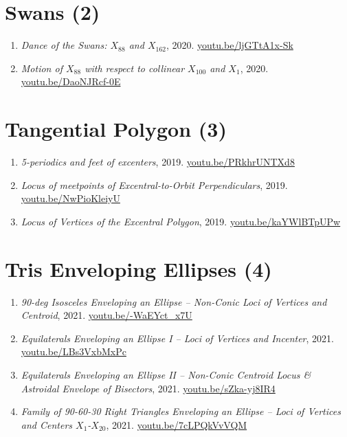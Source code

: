 \documentclass[12pt]{article}
\begin{document}
\section{Swans (2)}

\begin{enumerate}[resume]
\item \textit{Dance of the Swans: $X_{88}$ and $X_{162}$}, 2020. \href{https://youtu.be/ljGTtA1x-Sk}{\url{youtu.be/ljGTtA1x-Sk}}
\item \textit{Motion of $X_{88}$ with respect to collinear $X_{100}$ and $X_{1}$}, 2020. \href{https://youtu.be/DaoNJRcf-0E}{\url{youtu.be/DaoNJRcf-0E}}
\end{enumerate}

\section{Tangential Polygon (3)}

\begin{enumerate}[resume]
\item \textit{5-periodics and feet of excenters}, 2019. \href{https://youtu.be/PRkhrUNTXd8}{\url{youtu.be/PRkhrUNTXd8}}
\item \textit{Locus of meetpoints of Excentral-to-Orbit Perpendiculars}, 2019. \href{https://youtu.be/NwPioKleiyU}{\url{youtu.be/NwPioKleiyU}}
\item \textit{Locus of Vertices of the Excentral Polygon}, 2019. \href{https://youtu.be/kaYWlBTpUPw}{\url{youtu.be/kaYWlBTpUPw}}
\end{enumerate}

\section{Tris Enveloping Ellipses (4)}

\begin{enumerate}[resume]
\item \textit{90-deg Isosceles Enveloping an Ellipse -- Non-Conic Loci of Vertices and Centroid}, 2021. \href{https://youtu.be/-WaEYct_x7U}{\url{youtu.be/-WaEYct\_x7U}}
\item \textit{Equilaterals Enveloping an Ellipse I -- Loci of Vertices and Incenter}, 2021. \href{https://youtu.be/LBs3VxbMxPc}{\url{youtu.be/LBs3VxbMxPc}}
\item \textit{Equilaterals Enveloping an Ellipse II -- Non-Conic Centroid Locus \& Astroidal Envelope of Bisectors}, 2021. \href{https://youtu.be/sZka-yj8IR4}{\url{youtu.be/sZka-yj8IR4}}
\item \textit{Family of 90-60-30 Right Triangles Enveloping an Ellipse -- Loci of Vertices and Centers $X_{1}$-$X_{20}$}, 2021. \href{https://youtu.be/7cLPQkVvVQM}{\url{youtu.be/7cLPQkVvVQM}}
\end{enumerate}
\end{document}
